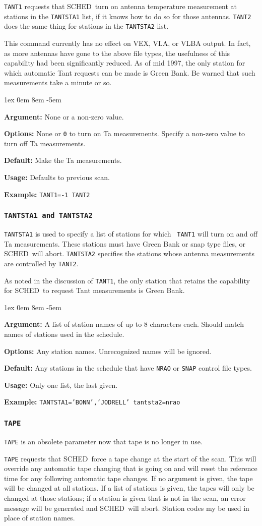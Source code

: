 \documentclass{report}
\newcommand{\schedb}{{\sc SCHED~}}
\newcommand{\rcwbox}[5]{
  \begin{list}{}{\parsep 1ex  \itemsep 0em
                 \leftmargin 8em  \itemindent -5em }
    \item {\bf Argument:} #1
    \item {\bf Options:}  #2
    \item {\bf Default:}  #3
    \item {\bf Usage:}    #4
    \item {\bf Example:}  #5
  \end{list}
}
\begin{document}
{\tt TANT1} requests that \schedb turn on antenna temperature
measurement at stations in the {\tt TANTSTA1} list, if it knows
how to do so for those antennas.   {\tt TANT2} does the same thing
for stations in the {\tt TANTSTA2} list.

This command currently has no effect on VEX, VLA, or VLBA output.
In fact, as more antennas have gone to the above file types, the
usefulness of this capability had been significantly reduced.
As of mid 1997, the only station for which automatic Tant requests
can be made is Green Bank.  Be warned that such measurements take
a minute or so.

\rcwbox
{None or a non-zero value.}
{None or {\tt 0} to turn on Ta measurements. Specify a non-zero
value to turn off Ta measurements.}
{Make the Ta measurements.}
{Defaults to previous scan.}
{{\tt TANT1=-1  TANT2 }}


\subsubsection{\label{MP:TANTSTA1}{\tt TANTSTA1 and TANTSTA2}}

{\tt TANTSTA1} is used to specify a list of stations for which {\tt
TANT1} will turn on and off Ta measurements. These stations must have
Green Bank or snap type files, or \schedb will abort.
{\tt TANTSTA2} specifies the stations whose antenna measurements
are controlled by {\tt TANT2}.

As noted in the discussion of {\tt TANT1}, the only station that
retains the capability for \schedb to request Tant measurements is
Green Bank.

\rcwbox
{A list of station names of up to 8 characters each. Should match names
of stations used in the schedule.}
{Any station names. Unrecognized names will be ignored.}
{Any stations in the schedule that have {\tt NRAO} or {\tt SNAP}
control file types.}
{Only one list, the last given.}
{{\tt TANTSTA1='BONN','JODRELL'  tantsta2=nrao}}


\subsubsection{\label{MP:TAPE}{\tt TAPE}}

{\tt TAPE} is an obsolete parameter now that tape is no longer in use.

{\tt TAPE} requests that \schedb force a tape change at the start
of the scan.  This will override any automatic tape changing that is
going on and will reset the reference time for any following automatic
tape changes. If no argument is given, the tape will be changed at all
stations. If a list of stations is given, the tapes will only be
changed at those stations; if a station is given that is not in the
scan, an error message will be generated and \schedb will abort.
Station codes my be used in place of station names.
\end{document}
